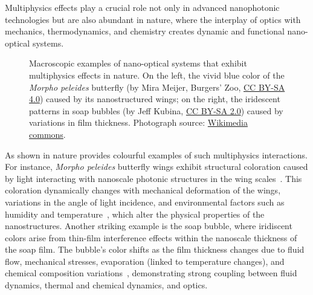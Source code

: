 Multiphysics effects play a crucial role not only in advanced nanophotonic technologies but are also abundant in nature, where the interplay of optics with mechanics, thermodynamics, and chemistry creates dynamic and functional nano-optical systems.

\begin{figure}[b!]
    \centering
    \caption{Macroscopic examples of nano-optical systems that exhibit multiphysics effects in nature. On the left, the vivid blue color of the \textit{Morpho peleides} butterfly (by Mira Meijer, Burgers' Zoo, \href{https://creativecommons.org/licenses/by-sa/4.0/}{CC BY-SA 4.0}) caused by its nanostructured wings; on the right, the iridescent patterns in soap bubbles (by Jeff Kubina, \href{https://creativecommons.org/licenses/by-sa/2.0/}{CC BY-SA 2.0}) caused by variations in film thickness. Photograph source: \href{https://commons.wikimedia.org/wiki/Main_Page}{Wikimedia commons}.}
    \label{fig:motivation_natural}
\end{figure}

As shown in  nature provides colourful examples of such multiphysics interactions. For instance, \textit{Morpho peleides} butterfly wings exhibit structural coloration caused by light interacting with nanoscale photonic structures in the wing scales~\cite{butterfly}. This coloration dynamically changes with mechanical deformation of the wings, variations in the angle of light incidence, and environmental factors such as humidity and temperature~\cite{morpho_temp}, which alter the physical properties of the nanostructures. 
Another striking example is the soap bubble, where iridiscent colors arise from thin-film interference effects within the nanoscale thickness of the soap film. The bubble's color shifts as the film thickness changes due to fluid flow, mechanical stresses, evaporation (linked to temperature changes), and chemical composition variations~\cite{bubble}, demonstrating strong coupling between fluid dynamics, thermal and chemical dynamics, and optics.

